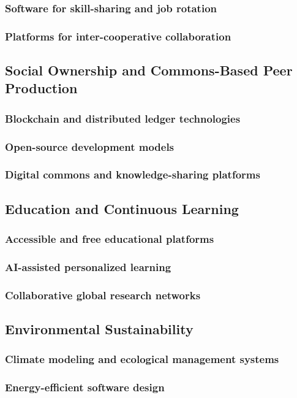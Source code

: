 \subsubsection{Software for skill-sharing and job rotation}
\subsubsection{Platforms for inter-cooperative collaboration}
\subsection{Social Ownership and Commons-Based Peer Production}
\subsubsection{Blockchain and distributed ledger technologies}
\subsubsection{Open-source development models}
\subsubsection{Digital commons and knowledge-sharing platforms}
\subsection{Education and Continuous Learning}
\subsubsection{Accessible and free educational platforms}
\subsubsection{AI-assisted personalized learning}
\subsubsection{Collaborative global research networks}
\subsection{Environmental Sustainability}
\subsubsection{Climate modeling and ecological management systems}
\subsubsection{Energy-efficient software design}

